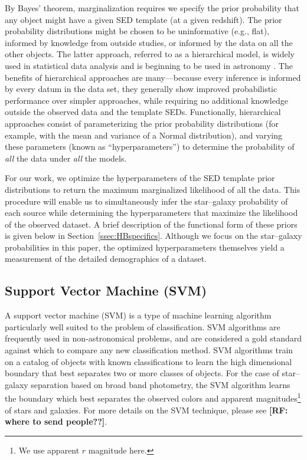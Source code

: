 \documentclass[12pt,preprint]{aastex}
\newcommand\rf[1]{{\bf [RF: #1]}}
\begin{document}
By Bayes' theorem, marginalization requires we specify the prior
probability that any object might have a given SED template (at a
given redshift).  The prior probability distributions might be chosen
to be uninformative (e.g., flat), informed by knowledge from outside
studies, or informed by the data on all the other objects.  The latter
approach, referred to as a hierarchical model, is widely used in
statistical data analysis \citep[e.g.,][]{gelman03} and is beginning
to be used in astronomy \citep{eccentricity, shu12}.  The benefits of
hierarchical approaches are many---because every inference is informed
by every datum in the data set, they generally show improved
probabilistic performance over simpler approaches, while requiring no
additional knowledge outside the observed data and the template SEDs.
Functionally, hierarchical approaches consist of parameterizing the
prior probability distributions (for example, with the mean and
variance of a Normal distribution), and varying these parameters
(known as ``hyperparameters'') to determine the probability
of \emph{all} the data under
\emph{all} the models.

For our work, we optimize the hyperparameters of the SED template
prior distributions to return the maximum marginalized likelihood of
all the data.  This procedure will enable us to simultaneously infer
the star--galaxy probability of each source while determining the
hyperparameters that maximize the likelihood of the observed dataset.
A brief description of the functional form of these priors is given
below in Section~\ref{ssec:HBspecifics}.  Although we focus on the
star--galaxy probabilities in this paper, the optimized hyperparameters
themselves yield a measurement of the detailed demographics of a
dataset. 

\subsection{Support Vector Machine (SVM)}
\label{ssec:SVMmethod}

A support vector machine (SVM) is a type of machine learning algorithm
particularly well suited to the problem of classification.  SVM
algorithms are frequently used in non-astronomical problems, and are
considered a gold standard against which to compare any new
classification method.  SVM algorithms train on a catalog of objects
with known classifications to learn the high dimensional boundary that
best separates two or more classes of objects.
For the case of star--galaxy separation based on broad band photometry,
the SVM algorithm learns the boundary which best separates the
observed colors and apparent magnitudes\footnote{We use apparent $r$
  magnitude here.} of stars and galaxies.  For more details on the SVM 
  technique, please see \rf{where to send people??}.
\end{document}
